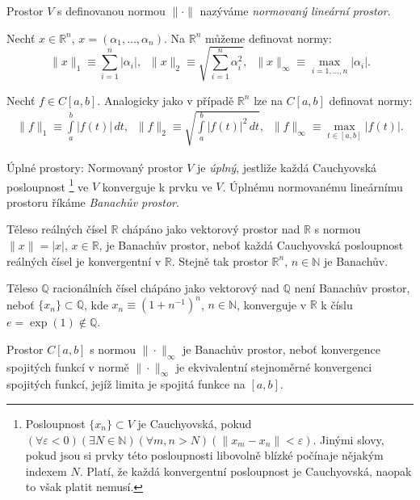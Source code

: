 Prostor $V$ s definovanou normou $\|\cdot\|$ nazýváme 
\emph{normovaný lineární prostor}.

\begin{ex}
   Nechť $x\in\mathbb{R}^n$, $x=(\alpha_1,\ldots,\alpha_n)$.
   Na $\mathbb{R}^n$ můžeme definovat normy:
   \[
         \|x\|_1 \equiv \sum\limits_{i=1}^n |\alpha_i|,\;\;
         \|x\|_2 \equiv \sqrt{\sum\limits_{i=1}^n \alpha_i^2},\;\;
         \|x\|_{\infty} \equiv \max\limits_{i=1,\ldots,n}|\alpha_i|.
   \]
\end{ex}

\begin{ex}
   Nechť $f\in C[a,b]$.
   Analogicky jako v případě $\mathbb{R}^n$ lze na $C[a,b]$ definovat normy:
   \[
      \begin{split}
         \|f\|_1 \equiv \int\limits_a^b|f(t)|\,dt,\;\;
         \|f\|_2 \equiv \sqrt{\int\limits_a^b|f(t)|^2\,dt},\;\;
         \|f\|_{\infty} \equiv \max\limits_{t\in[a,b]}|f(t)|.
      \end{split}
   \]
\end{ex}

Úplné prostory: Normovaný prostor $V$ je \emph{úplný}, jestliže každá 
Cauchyovská posloupnost%
\footnote{Posloupnost $\{x_n\}\subset V$ je Cauchyovská, pokud 
$(\forall \varepsilon<0)(\exists N\in\mathbb{N})(\forall m,n>N)
(\|x_m-x_n\|<\varepsilon)$. Jinými slovy, pokud jsou si prvky této posloupnosti
libovolně blízké počínaje nějakým indexem $N$. Platí, že každá konvergentní
posloupnost je Cauchyovská, naopak to však platit nemusí.}
ve $V$ konverguje k prvku ve $V$.
Úplnému normovanému lineárnímu prostoru říkáme \emph{Banachův prostor}.

\begin{ex}
   Těleso reálných čísel $\mathbb{R}$ chápáno jako vektorový prostor nad $\mathbb{R}$
   s normou $\|x\|=|x|$, $x\in\mathbb{R}$, je Banachův prostor,
   neboť každá Cauchyovská posloupnost reálných čísel je konvergentní v $\mathbb{R}$.
   Stejně tak prostor $\mathbb{R}^n$, $n\in\mathbb{N}$ je Banachův.
\end{ex}

\begin{ex}
   Těleso $\mathbb{Q}$ racionálních čísel chápáno jako vektorový nad $\mathbb{Q}$
   není Banachův prostor, neboť $\{x_n\}\subset\mathbb{Q}$, kde
   $x_n\equiv (1+n^{-1})^n$, $n\in\mathbb{N}$, konverguje v $\mathbb{R}$
   k číslu $e=\exp(1)\not\in\mathbb{Q}$.
\end{ex}

\begin{ex}
   Prostor $C[a,b]$ s normou $\|\cdot\|_{\infty}$
   je Banachův prostor, neboť konvergence spojitých funkcí v normě 
   $\|\cdot\|_{\infty}$ je ekvivalentní stejnoměrné konvergenci spojitých funkcí,
   jejíž limita je spojitá funkce na $[a,b]$.
\end{ex}

